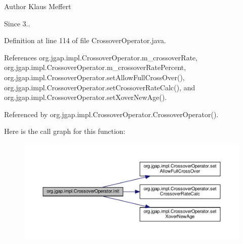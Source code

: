 \begin{DoxyAuthor}{Author}
Klaus Meffert 
\end{DoxyAuthor}
\begin{DoxySince}{Since}
3.. 
\end{DoxySince}


Definition at line 114 of file Crossover\-Operator.\-java.



References org.\-jgap.\-impl.\-Crossover\-Operator.\-m\-\_\-crossover\-Rate, org.\-jgap.\-impl.\-Crossover\-Operator.\-m\-\_\-crossover\-Rate\-Percent, org.\-jgap.\-impl.\-Crossover\-Operator.\-set\-Allow\-Full\-Cross\-Over(), org.\-jgap.\-impl.\-Crossover\-Operator.\-set\-Crossover\-Rate\-Calc(), and org.\-jgap.\-impl.\-Crossover\-Operator.\-set\-Xover\-New\-Age().



Referenced by org.\-jgap.\-impl.\-Crossover\-Operator.\-Crossover\-Operator().



Here is the call graph for this function\-:
\nopagebreak
\begin{figure}[H]
\begin{center}
\leavevmode
\includegraphics[width=350pt]{classorg_1_1jgap_1_1impl_1_1_crossover_operator_aa912b24ed525835736758d64e373207d_cgraph}
\end{center}
\end{figure}


